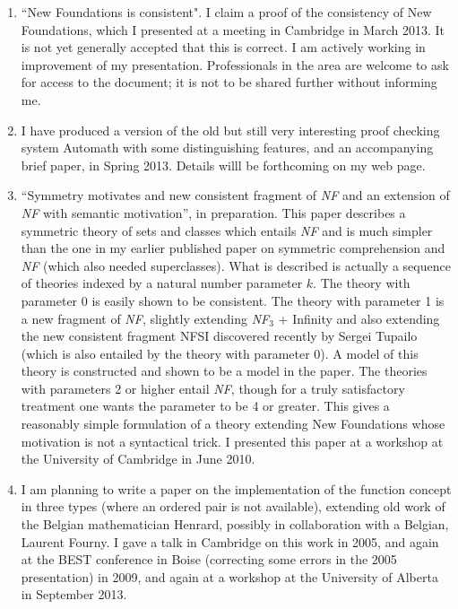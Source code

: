 \begin{description}
\begin{enumerate}
\item ``New Foundations is consistent".  I claim a proof of the consistency of New Foundations, which I presented at a meeting in Cambridge in March 2013.  It is not yet generally accepted that this is correct.  I am actively working in improvement of my presentation.   Professionals in the area are welcome to ask for access to the document; it is not to be shared further without informing me.

\item  I have produced a version of the old but still very interesting proof checking system Automath with some distinguishing features, and an accompanying brief paper, in Spring 2013.   Details willl be forthcoming on my web page.



\item ``Symmetry motivates and new consistent fragment of {\em NF\/}
and an extension of {\em NF\/} with semantic motivation'', in
preparation.   This paper describes a
symmetric theory of sets and classes which entails {\em NF\/} and is
much simpler than the one in my earlier published paper on symmetric
comprehension and {\em NF\/} (which also needed superclasses).  What
is described is actually a sequence of theories indexed by a natural
number parameter $k$.  The theory with parameter 0 is easily shown to
be consistent.  The theory with parameter 1 is a new fragment of {\em
NF\/}, slightly extending {\em NF$_3$\/} + Infinity and also extending
the new consistent fragment NFSI discovered recently by Sergei Tupailo
(which is also entailed by the theory with parameter 0).  A model of
this theory is constructed and shown to be a model in the paper.  The
theories with parameters 2 or higher entail {\em NF\/}, though for a
truly satisfactory treatment one wants the parameter to be 4 or
greater.  This gives a reasonably simple formulation of a theory
extending New Foundations whose motivation is not a syntactical trick.
I presented this paper at a workshop at the University of Cambridge in
June 2010.

\item I am planning to write a paper on the implementation of the
function concept in three types (where an ordered pair is not
available), extending old work of the Belgian mathematician Henrard,
possibly in collaboration with a Belgian, Laurent Fourny.  I gave a
talk in Cambridge on this work in 2005, and again at the BEST
conference in Boise (correcting some errors in the 2005 presentation)
in 2009, and again at a workshop at the University of Alberta in September 2013.


\end{enumerate}
\end{description}
